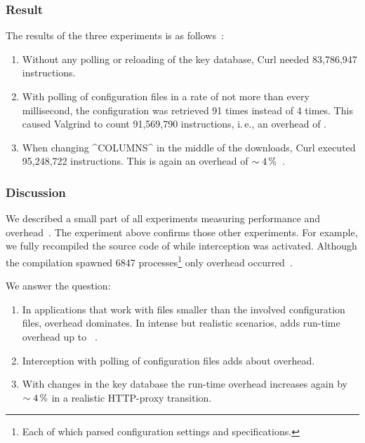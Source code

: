 \subsubsection{Result}

The results of the three experiments is as follows~\cite{raab2016unanticipated}:
\begin{enumerate}
\item
Without any polling or reloading of the key database, Curl needed 83,786,947 instructions.
\item
With polling of configuration files in a rate of not more than every millisecond, the configuration was retrieved 91 times instead of 4 times.
This caused Valgrind to count 91,569,790 instructions, i.\,e., an overhead of .
\item
When changing ^COLUMNS^ in the middle of the downloads, Curl executed 95,248,722 instructions.
This is again an overhead of $\sim\SI{4}{\percent}$~\cite{raab2016unanticipated}.
\end{enumerate}

\subsubsection{Discussion}


We described a small part of all experiments measuring performance and overhead~\cite{raab2016unanticipated,raab2017introducing}.
The experiment above confirms those other experiments.
For example, we fully recompiled the source code of \elektra{} while interception was activated.
Although the compilation spawned 6847 processes\footnote{Each of which parsed configuration settings and specifications.} only  overhead occurred~\cite{raab2016unanticipated}.

We answer the question:
\rqUnmodifiedOverhead*

\begin{finding}
\fixtheorem
\begin{enumerate}
\item
In applications that work with files smaller than the involved configuration files, overhead dominates.
In intense but realistic scenarios, \elektra{} adds run-time overhead up to ~\cite{raab2016unanticipated}.

\item
Interception with polling of configuration files adds about  overhead.

\item
With changes in the key database the run-time overhead increases again by $\sim\SI{4}{\percent}$ in a realistic HTTP-proxy transition.
\end{enumerate}
\end{finding}

















